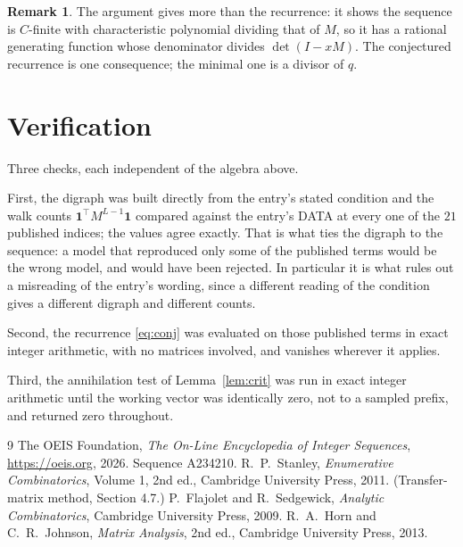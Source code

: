 \documentclass[11pt,a4paper]{article}
\theoremstyle{plain}
\theoremstyle{definition}
\newtheorem{remark}[theorem]{Remark}
\begin{document}
\begin{remark}
The argument gives more than the recurrence: it shows the sequence is $C$-finite with
characteristic polynomial dividing that of $M$, so it has a rational generating function
whose denominator divides $\det(I-xM)$. The conjectured recurrence is one consequence; the
minimal one is a divisor of $q$.
\end{remark}

\section{Verification}

Three checks, each independent of the algebra above.

First, the digraph was built directly from the entry's stated condition and the walk counts
$\mathbf{1}^{\!\top}M^{L-1}\mathbf{1}$ compared against the entry's DATA at
every one of the $21$ published indices; the values agree exactly. That is what ties
the digraph to the sequence: a model that reproduced only some of the published terms would
be the wrong model, and would have been rejected. In particular it is what rules out a
misreading of the entry's wording, since a different reading of the condition gives a
different digraph and different counts.

Second, the recurrence \eqref{eq:conj} was evaluated on those published terms in exact
integer arithmetic, with no matrices involved, and vanishes wherever it applies.

Third, the annihilation test of Lemma~\ref{lem:crit} was run in exact integer arithmetic
until the working vector was identically zero, not to a sampled prefix, and returned zero
throughout.

\begin{thebibliography}{9}
 The OEIS Foundation, \emph{The On-Line Encyclopedia of Integer
Sequences}, \url{https://oeis.org}, 2026. Sequence A234210.
 R.~P.~Stanley, \emph{Enumerative Combinatorics}, Volume 1, 2nd ed.,
Cambridge University Press, 2011. (Transfer-matrix method, Section 4.7.)
 P.~Flajolet and R.~Sedgewick, \emph{Analytic Combinatorics}, Cambridge
University Press, 2009.
 R.~A.~Horn and C.~R.~Johnson, \emph{Matrix Analysis}, 2nd ed., Cambridge
University Press, 2013.
\end{thebibliography}
\end{document}
